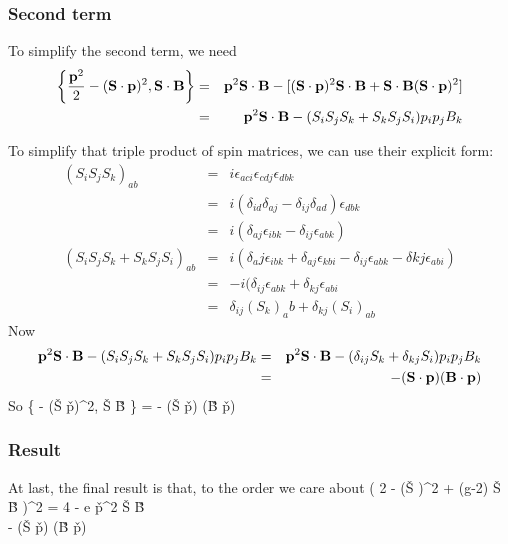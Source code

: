 \subsubsection*{Second term}
To simplify the second term, we need
\begin{eqnarray*}
\left \{ \frac{\mathbf{p}^2}{2} - (\mathbf{S} \cdot \mathbf{p})^2, \mathbf{S} \cdot \mathbf{B} \right \}
	&=&	 \mathbf{p}^2 \mathbf{S} \cdot \mathbf{B} - [(\mathbf{S} \cdot \mathbf{p})^2 \mathbf{S} \cdot \mathbf{B} + \mathbf{S} \cdot \mathbf{B} (\mathbf{S} \cdot \mathbf{p})^2  ]	\\
	&=&	 \mathbf{p}^2 \mathbf{S} \cdot \mathbf{B} - (S_i S_j S_k + S_k S_j S_i) p_i p_j B_k
\end{eqnarray*}

To simplify that triple product of spin matrices, we can use their explicit form:
\begin{eqnarray*}
	(S_i S_j S_k )_{ab}
		&=&	i\epsilon_{aci}\epsilon_{cdj}\epsilon_{dbk}	\\
		&=&	i(\delta_{id} \delta_{aj} - \delta_{ij} \delta_{ad})\epsilon_{dbk}	\\
		&=&	i(\delta_{aj} \epsilon_{ibk} - \delta_{ij} \epsilon_{abk})		\\
	(S_i S_j S_k + S_k S_j S_i)_{ab}
		&=& i(\delta_aj \epsilon_{ibk} + \delta_{aj} \epsilon_{kbi} -\delta_{ij} \epsilon_{abk} -\delta{kj}\epsilon_{abi})	\\
		&=& -i(\delta_{ij} \epsilon_{abk} + \delta_{kj} \epsilon_{abi}	\\
		&=&	\delta_{ij} {(S_k)}_ab + \delta_{kj} {(S_i)}_{ab}	
\end{eqnarray*}
Now 
\begin{eqnarray*}
 \mathbf{p}^2 \mathbf{S} \cdot \mathbf{B} - (S_i S_j S_k + S_k S_j S_i) p_i p_j B_k
 	&=& \mathbf{p}^2 \mathbf{S} \cdot \mathbf{B} - (\delta_{ij} S_k + \delta_{kj} S_i	) p_i p_j B_k	\\
 	&=& - (\mathbf{S} \cdot \mathbf{p}) (\mathbf{B} \cdot \mathbf{p})
\end{eqnarray*}
So
\beq \label{eq:A:SBanticom}
	\left \{  - (\v{S} \cdot \v{p})^2, \v{S} \cdot \v{B} \right \}
	 =
	 - (\v{S} \cdot \v{p}) (\v{B} \cdot \v{p})
\eeq

\subsubsection*{Result}
At last, the final result is that, to the order we care about 
\beq \label{eq:A:crossterm}
	\left(   {2} -  (\v{S} \cdot \gv{\pi})^2 + (g-2) \v{S} \cdot \v{B} \right )^2 
	=	 {4}  -  e \v{p}^2  \v{S} \cdot \v{B} \\
		 - (\v{S} \cdot \v{p}) (\v{B} \cdot \v{p})
\eeq





